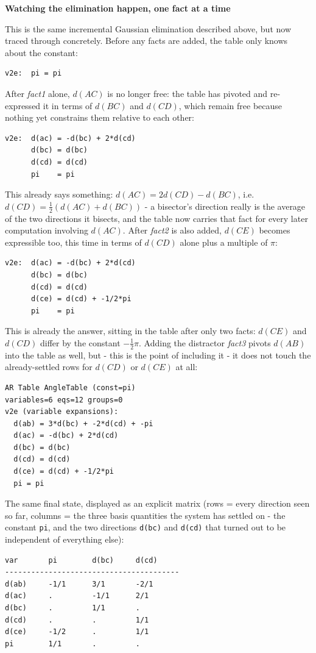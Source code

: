 \documentclass[reqno]{amsart}
\newcommand{\examplepart}[1]{%
    \par\medskip
    \noindent\textbf{\color{agblue}#1}\par\smallskip\noindent
}
\DeclareMathOperator{\1}{\textbf{1}}
\begin{document}
\examplepart{Watching the elimination happen, one fact at a time}
This is the
same incremental Gaussian elimination described above, but now traced
through concretely. Before any facts are added, the table only knows about
the constant:
\begin{lstlisting}
v2e:  pi = pi
\end{lstlisting}
After \emph{fact1} alone, $d(AC)$ is no longer free: the table has pivoted
and re-expressed it in terms of $d(BC)$ and $d(CD)$, which remain free
because nothing yet constrains them relative to each other:
\begin{lstlisting}
v2e:  d(ac) = -d(bc) + 2*d(cd)
      d(bc) = d(bc)
      d(cd) = d(cd)
      pi    = pi
\end{lstlisting}
This already says something: $d(AC) = 2d(CD) - d(BC)$, i.e.
$d(CD) = \tfrac12(d(AC)+d(BC))$ - a bisector's direction really is the
average of the two directions it bisects, and the table now carries that
fact for every later computation involving $d(AC)$. After \emph{fact2} is
also added, $d(CE)$ becomes expressible too, this time in terms of $d(CD)$
alone plus a multiple of $\pi$:
\begin{lstlisting}
v2e:  d(ac) = -d(bc) + 2*d(cd)
      d(bc) = d(bc)
      d(cd) = d(cd)
      d(ce) = d(cd) + -1/2*pi
      pi    = pi
\end{lstlisting}
This is already the answer, sitting in the table after only two facts: $d(CE)$
and $d(CD)$ differ by the constant $-\frac12\pi$. Adding the distractor
\emph{fact3} pivots $d(AB)$ into the table as well, but - this is the point
of including it - it does not touch the already-settled rows for $d(CD)$ or
$d(CE)$ at all:
\begin{lstlisting}
AR Table AngleTable (const=pi)
variables=6 eqs=12 groups=0
v2e (variable expansions):
  d(ab) = 3*d(bc) + -2*d(cd) + -pi
  d(ac) = -d(bc) + 2*d(cd)
  d(bc) = d(bc)
  d(cd) = d(cd)
  d(ce) = d(cd) + -1/2*pi
  pi = pi
\end{lstlisting}
The same final state, displayed as an explicit matrix (rows = every
direction seen so far, columns = the three basis quantities the system has
settled on - the constant \verb|pi|, and the two directions \verb|d(bc)| and
\verb|d(cd)| that turned out to be independent of everything else):
\begin{lstlisting}
var       pi        d(bc)     d(cd)
----------------------------------------
d(ab)     -1/1      3/1       -2/1
d(ac)     .         -1/1      2/1
d(bc)     .         1/1       .
d(cd)     .         .         1/1
d(ce)     -1/2      .         1/1
pi        1/1       .         .
\end{lstlisting}
\end{document}
